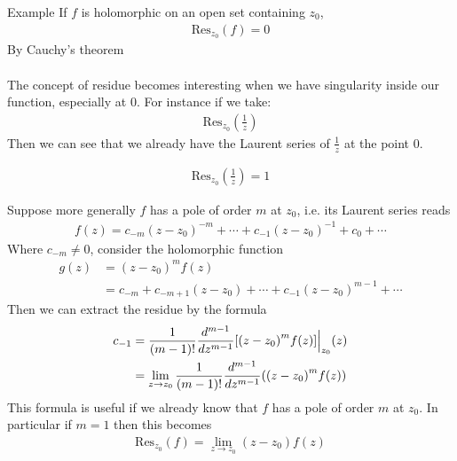 \begin{parag}{Example}
    If $f$ is holomorphic on an open set containing $z_0$,
	\begin{align*} 
		\text{Res}_{z_0} \left(f\right) = 0
	\end{align*}
	By Cauchy's theorem\\
	$ $\\

The concept of residue becomes interesting when we have singularity inside our function, especially at $0$. For instance if we take:
\begin{align*} 
	\text{Res}_{z_0}\left(\frac{1}{z}\right)
\end{align*}
Then we can see that we already have the Laurent series of $\frac{1}{z}$ at the point $0$.

\begin{align*} 
	\text{Res}_{z_0}\left(\frac{1}{z}\right) = 1
\end{align*}

    Suppose more generally $f$ has a pole of order $m$ at $z_0$, i.e. its Laurent series reads
	\begin{align*} 
		f\left(z\right) = c_{-m}\left(z - z_0\right)^{-m} + \cdots + c_{-1}\left(z - z_0\right)^{-1} + c_0 + \cdots
	\end{align*}
	Where $c_{-m} \neq 0$, consider the holomorphic function
	\begin{align*} 
		g\left(z\right) &=  \left(z - z_0\right)^{m}f\left(z\right)\\
						&=  c_{-m} + c_{-m + 1}\left(z - z_0\right) + \cdots + c_{-1}\left(z -z_0\right)^{m - 1} + \cdots
	\end{align*}
	Then we can extract the residue by the formula 
	\begin{align*} 
		c_{-1} &= \frac{1}{\left(m - 1\right)!} \frac{d^{m-1}}{dz^{m-1}} [\left(z - z_0\right)^{m}f(z)]\eval_{z_0}\left(z\right)\\
		&= \lim_{z  \to z_0}  \frac{1}{\left(m - 1\right)!}\frac{d^{m-1}}{dz^{m-1}}\left(\left(z - z_0\right)^{m}f\left(z\right)\right)
	\end{align*}
	This formula is useful if we already know that $f$ has a pole of order $m$ at $z_0$. In particular if $m = 1$ then this becomes
	\begin{align*} 
		\text{Res}_{z_0}\left(f\right) =  \lim_{z  \to z_0} \left(z - z_0\right)f\left(z\right)
	\end{align*}

\end{parag}


